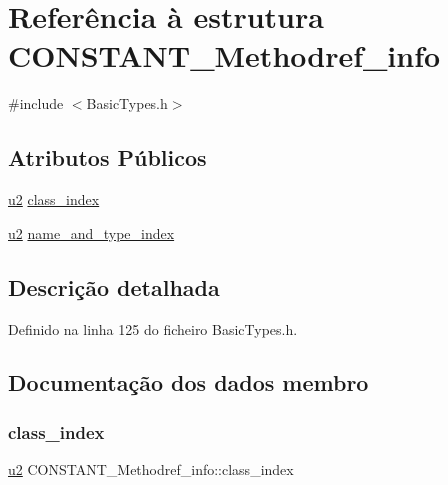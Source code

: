 \hypertarget{structCONSTANT__Methodref__info}{}\section{Referência à estrutura C\+O\+N\+S\+T\+A\+N\+T\+\_\+\+Methodref\+\_\+info}
\label{structCONSTANT__Methodref__info}


{\ttfamily \#include $<$Basic\+Types.\+h$>$}

\subsection*{Atributos Públicos}
\begin{DoxyCompactItemize}
\item 
\hyperlink{BasicTypes_8h_a732cde1300aafb73b0ea6c2558a7a54f}{u2} \hyperlink{structCONSTANT__Methodref__info_ac625db7f532b350843d6cb88c3fbde0c}{class\+\_\+index}
\item 
\hyperlink{BasicTypes_8h_a732cde1300aafb73b0ea6c2558a7a54f}{u2} \hyperlink{structCONSTANT__Methodref__info_aa5933f9d2469d4be22a19960bb25da5e}{name\+\_\+and\+\_\+type\+\_\+index}
\end{DoxyCompactItemize}


\subsection{Descrição detalhada}


Definido na linha 125 do ficheiro Basic\+Types.\+h.



\subsection{Documentação dos dados membro}
\mbox{\label{structCONSTANT__Methodref__info_ac625db7f532b350843d6cb88c3fbde0c}} 
\subsubsection{\texorpdfstring{class\+\_\+index}{class\_index}}
{\footnotesize\ttfamily \hyperlink{BasicTypes_8h_a732cde1300aafb73b0ea6c2558a7a54f}{u2} C\+O\+N\+S\+T\+A\+N\+T\+\_\+\+Methodref\+\_\+info\+::class\+\_\+index}



